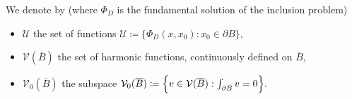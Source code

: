 \documentclass[10pt]{beamer}
\theoremstyle{plain}
\theoremstyle{plain}
\begin{document}
\begin{frame}
\vspace{0.8cm}
We denote by (where $\Phi_D$ is the fundamental solution of the inclusion problem)
\begin{itemize}
 \item $\mathcal{U}$ the set of functions
$
 \mathcal{U}\coloneqq\bigl\{\Phi_D(x, x_0): x_0\in \partial B\bigr\},
$
 \item $\mathcal{V}(\overline{B})$ the set of harmonic functions, continuously defined on $\overline{B}$,
 \item $\mathcal{V}_0(\overline{B})$ the subspace 
$
  \mathcal{V}_0(\overline{B})\coloneqq\Bigl\{v\in\mathcal{V}(\overline{B}):\int_{\partial B} v = 0\Bigr\}.
$
\end{itemize}
\end{frame}
\end{document}
